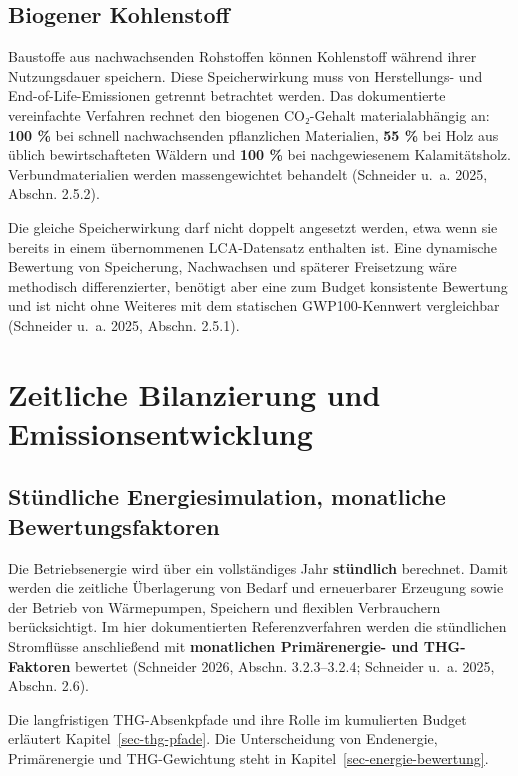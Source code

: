 \documentclass[
  ngerman,
  a4paper,
  DIV=11]{scrreprt}
\begin{document}
\subsection{Biogener Kohlenstoff}\label{biogener-kohlenstoff}

Baustoffe aus nachwachsenden Rohstoffen können Kohlenstoff während ihrer
Nutzungsdauer speichern. Diese Speicherwirkung muss von Herstellungs-
und End-of-Life-Emissionen getrennt betrachtet werden. Das dokumentierte
vereinfachte Verfahren rechnet den biogenen CO₂-Gehalt materialabhängig
an: \textbf{100 \%} bei schnell nachwachsenden pflanzlichen Materialien,
\textbf{55 \%} bei Holz aus üblich bewirtschafteten Wäldern und
\textbf{100 \%} bei nachgewiesenem Kalamitätsholz. Verbundmaterialien
werden massengewichtet behandelt (Schneider u.~a. 2025, Abschn. 2.5.2).

Die gleiche Speicherwirkung darf nicht doppelt angesetzt werden, etwa
wenn sie bereits in einem übernommenen LCA-Datensatz enthalten ist. Eine
dynamische Bewertung von Speicherung, Nachwachsen und späterer
Freisetzung wäre methodisch differenzierter, benötigt aber eine zum
Budget konsistente Bewertung und ist nicht ohne Weiteres mit dem
statischen GWP100-Kennwert vergleichbar (Schneider u.~a. 2025, Abschn.
2.5.1).

\section{Zeitliche Bilanzierung und
Emissionsentwicklung}\label{zeitliche-bilanzierung-und-emissionsentwicklung}

\subsection{Stündliche Energiesimulation, monatliche
Bewertungsfaktoren}\label{stuxfcndliche-energiesimulation-monatliche-bewertungsfaktoren}

Die Betriebsenergie wird über ein vollständiges Jahr \textbf{stündlich}
berechnet. Damit werden die zeitliche Überlagerung von Bedarf und
erneuerbarer Erzeugung sowie der Betrieb von Wärmepumpen, Speichern und
flexiblen Verbrauchern berücksichtigt. Im hier dokumentierten
Referenzverfahren werden die stündlichen Stromflüsse anschließend mit
\textbf{monatlichen Primärenergie- und THG-Faktoren} bewertet (Schneider
2026, Abschn. 3.2.3--3.2.4; Schneider u.~a. 2025, Abschn. 2.6).

Die langfristigen THG-Absenkpfade und ihre Rolle im kumulierten Budget
erläutert Kapitel~\ref{sec-thg-pfade}. Die Unterscheidung von
Endenergie, Primärenergie und THG-Gewichtung steht in
Kapitel~\ref{sec-energie-bewertung}.
\end{document}
